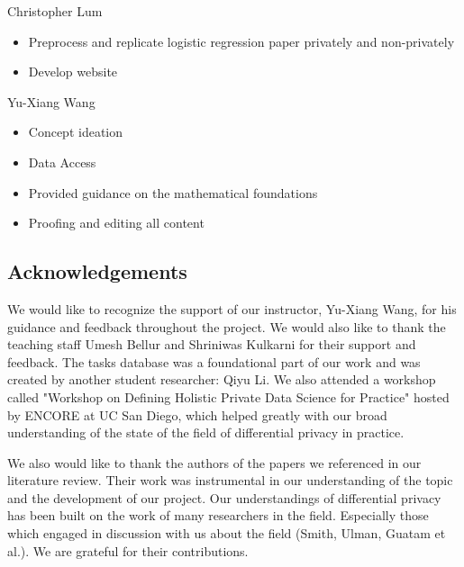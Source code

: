 \documentclass[12pt,letterpaper]{article}
\begin{document}
{Christopher Lum
\begin{itemize}
  \item Preprocess and replicate logistic regression paper privately and non-privately
  \item Develop website
\end{itemize}

Yu-Xiang Wang
\begin{itemize}
  \item Concept ideation
  \item Data Access
  \item Provided guidance on the mathematical foundations
  \item Proofing and editing all content
\end{itemize}


\subsection{Acknowledgements}

We would like to recognize the support of our instructor, Yu-Xiang Wang, for his guidance and feedback throughout the project. We would also like to thank the teaching staff Umesh Bellur and Shriniwas Kulkarni for their support and feedback. The tasks database was a foundational part of our work and was created by another student researcher: Qiyu Li. We also attended a workshop called "Workshop on Defining Holistic Private Data Science for Practice" hosted by ENCORE at UC San Diego, which helped greatly with our broad understanding of the state of the field of differential privacy in practice.

We also would like to thank the authors of the papers we referenced in our literature review. Their work was instrumental in our understanding of the topic and the development of our project. Our understandings of differential privacy has been built on the work of many researchers in the field. Especially those which engaged in discussion with us about the field (Smith, Ulman, Guatam et al.). We are grateful for their contributions.

%

\makereference







}
\end{document}
